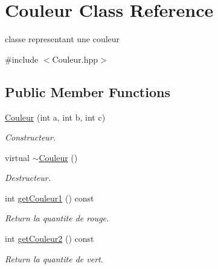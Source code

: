 \hypertarget{class_couleur}{}\section{Couleur Class Reference}
\label{class_couleur}


classe representant une couleur  




{\ttfamily \#include $<$Couleur.\+hpp$>$}

\subsection*{Public Member Functions}
\begin{DoxyCompactItemize}
\item 
\mbox{\hyperlink{class_couleur_af20332471d6556354bda12773762db79}{Couleur}} (int a, int b, int c)
\begin{DoxyCompactList}\small\item\em Constructeur. \end{DoxyCompactList}\item 
\mbox{\label{class_couleur_a7f87014f3347e59b47b6a39eb3a525fd}} 
virtual \mbox{\hyperlink{class_couleur_a7f87014f3347e59b47b6a39eb3a525fd}{$\sim$\+Couleur}} ()
\begin{DoxyCompactList}\small\item\em Destructeur. \end{DoxyCompactList}\item 
\mbox{\label{class_couleur_a95bc5a057a0fe0c4413ecafb833ca3d0}} 
int \mbox{\hyperlink{class_couleur_a95bc5a057a0fe0c4413ecafb833ca3d0}{get\+Couleur1}} () const
\begin{DoxyCompactList}\small\item\em Return la quantite de rouge. \end{DoxyCompactList}\item 
\mbox{\label{class_couleur_ae85783701330cadf91b67875fb301473}} 
int \mbox{\hyperlink{class_couleur_ae85783701330cadf91b67875fb301473}{get\+Couleur2}} () const
\begin{DoxyCompactList}\small\item\em Return la quantite de vert. \end{DoxyCompactList}\item 
\mbox{\label{class_couleur_a0b48fffca467fe372414ea409b19f1fd}} 

\end{DoxyCompactItemize}
